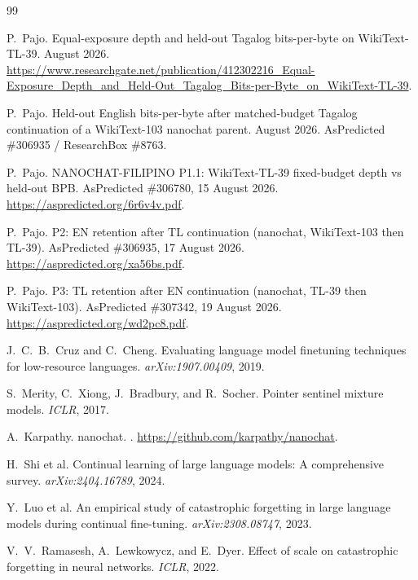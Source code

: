 \documentclass[11pt,a4paper]{article}
\begin{document}
\begin{thebibliography}{99}

P.~Pajo.
\newblock Equal-exposure depth and held-out Tagalog bits-per-byte on WikiText-TL-39.
 August 2026.
\newblock \url{https://www.researchgate.net/publication/412302216_Equal-Exposure_Depth_and_Held-Out_Tagalog_Bits-per-Byte_on_WikiText-TL-39}.

P.~Pajo.
\newblock Held-out English bits-per-byte after matched-budget Tagalog continuation of a WikiText-103 nanochat parent.
 August 2026.
\newblock AsPredicted \#306935 / ResearchBox \#8763.

P.~Pajo.
\newblock NANOCHAT-FILIPINO P1.1: WikiText-TL-39 fixed-budget depth vs held-out BPB.
\newblock AsPredicted \#306780, 15 August 2026.
\newblock \url{https://aspredicted.org/6r6v4v.pdf}.

P.~Pajo.
\newblock P2: EN retention after TL continuation (nanochat, WikiText-103 then TL-39).
\newblock AsPredicted \#306935, 17 August 2026.
\newblock \url{https://aspredicted.org/xa56bs.pdf}.

P.~Pajo.
\newblock P3: TL retention after EN continuation (nanochat, TL-39 then WikiText-103).
\newblock AsPredicted \#307342, 19 August 2026.
\newblock \url{https://aspredicted.org/wd2pc8.pdf}.

J.~C.~B.~Cruz and C.~Cheng.
\newblock Evaluating language model finetuning techniques for low-resource languages.
\newblock \emph{arXiv:1907.00409}, 2019.

S.~Merity, C.~Xiong, J.~Bradbury, and R.~Socher.
\newblock Pointer sentinel mixture models.
\newblock \emph{ICLR}, 2017.

A.~Karpathy.
\newblock nanochat.
.
\newblock \url{https://github.com/karpathy/nanochat}.

H.~Shi et al.
\newblock Continual learning of large language models: A comprehensive survey.
\newblock \emph{arXiv:2404.16789}, 2024.

Y.~Luo et al.
\newblock An empirical study of catastrophic forgetting in large language models during continual fine-tuning.
\newblock \emph{arXiv:2308.08747}, 2023.

V.~V.~Ramasesh, A.~Lewkowycz, and E.~Dyer.
\newblock Effect of scale on catastrophic forgetting in neural networks.
\newblock \emph{ICLR}, 2022.


\end{thebibliography}
\end{document}
